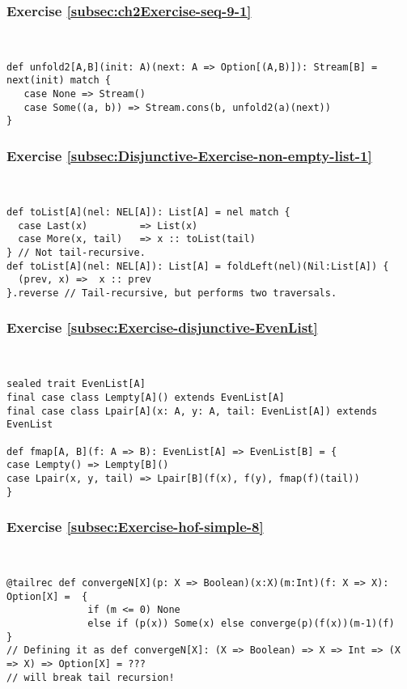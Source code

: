 \subsubsection*{Exercise \ref{subsec:ch2Exercise-seq-9-1}}

~
\begin{lstlisting}
def unfold2[A,B](init: A)(next: A => Option[(A,B)]): Stream[B] = next(init) match {
   case None => Stream()
   case Some((a, b)) => Stream.cons(b, unfold2(a)(next))
}
\end{lstlisting}


\subsubsection*{Exercise \ref{subsec:Disjunctive-Exercise-non-empty-list-1}}

~
\begin{lstlisting}
def toList[A](nel: NEL[A]): List[A] = nel match {
  case Last(x)         => List(x)
  case More(x, tail)   => x :: toList(tail)
} // Not tail-recursive.
def toList[A](nel: NEL[A]): List[A] = foldLeft(nel)(Nil:List[A]) {
  (prev, x) =>  x :: prev
}.reverse // Tail-recursive, but performs two traversals.
\end{lstlisting}


\subsubsection*{Exercise \ref{subsec:Exercise-disjunctive-EvenList}}

~
\begin{lstlisting}
sealed trait EvenList[A]
final case class Lempty[A]() extends EvenList[A]
final case class Lpair[A](x: A, y: A, tail: EvenList[A]) extends EvenList

def fmap[A, B](f: A => B): EvenList[A] => EvenList[B] = {
case Lempty() => Lempty[B]()
case Lpair(x, y, tail) => Lpair[B](f(x), f(y), fmap(f)(tail))
}
\end{lstlisting}


\subsubsection*{Exercise \ref{subsec:Exercise-hof-simple-8}}

~
\begin{lstlisting}
@tailrec def convergeN[X](p: X => Boolean)(x:X)(m:Int)(f: X => X): Option[X] =  {
              if (m <= 0) None
              else if (p(x)) Some(x) else converge(p)(f(x))(m-1)(f)             }
// Defining it as def convergeN[X]: (X => Boolean) => X => Int => (X => X) => Option[X] = ???
// will break tail recursion!
\end{lstlisting}



